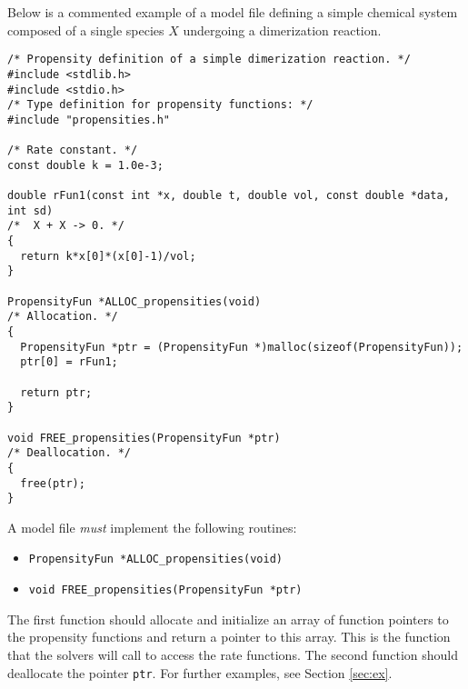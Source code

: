 Below is a commented example of a model file defining a simple
chemical system composed of a single species $X$ undergoing a
dimerization reaction.

\begin{verbatim}
/* Propensity definition of a simple dimerization reaction. */
#include <stdlib.h>
#include <stdio.h>
/* Type definition for propensity functions: */
#include "propensities.h"

/* Rate constant. */
const double k = 1.0e-3;

double rFun1(const int *x, double t, double vol, const double *data, int sd)
/*  X + X -> 0. */
{
  return k*x[0]*(x[0]-1)/vol;
}

PropensityFun *ALLOC_propensities(void)
/* Allocation. */
{
  PropensityFun *ptr = (PropensityFun *)malloc(sizeof(PropensityFun));
  ptr[0] = rFun1;

  return ptr;
}

void FREE_propensities(PropensityFun *ptr)
/* Deallocation. */
{
  free(ptr);
}

\end{verbatim}
\noindent
A model file \emph{must} implement the following routines:
\begin{itemize}
  \item \verb#PropensityFun *ALLOC_propensities(void)#
  \item \verb#void FREE_propensities(PropensityFun *ptr)#
\end{itemize}

\noindent
The first function should allocate and initialize an array of function
pointers to the propensity functions and return a pointer to this
array. This is the function that the solvers will call to access the
rate functions.  The second function should deallocate the pointer
\texttt{ptr}. For further examples, see Section \ref{sec:ex}.
